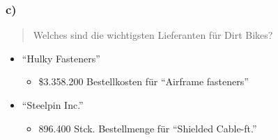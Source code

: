 \documentclass{beamer}
\begin{document}
\begin{frame}
\frametitle{c)}

\begin{quote}
Welches sind die wichtigsten Lieferanten für Dirt Bikes?
\end{quote}

\begin{itemize}
\setlength{\itemsep}{14pt}
\item ``Hulky Fasteners''
\begin{itemize}
\item \$3.358.200 Bestellkosten f\"ur ``Airframe fasteners''
\end{itemize}
\item ``Steelpin Inc.''
\begin{itemize}
\item 896.400 Stck. Bestellmenge f\"ur ``Shielded Cable-ft.''
\end{itemize}
\end{itemize}

\end{frame}
\end{document}
